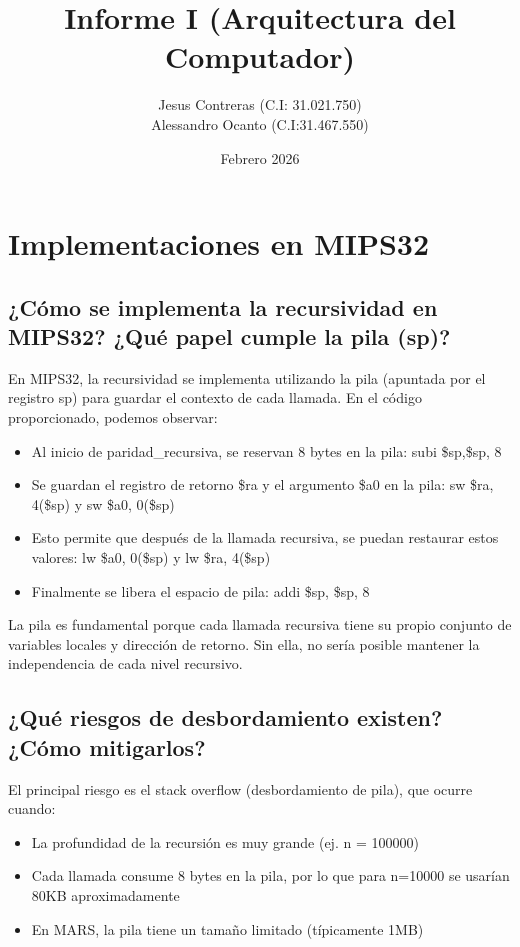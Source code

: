 \documentclass[12pt]{article}
\title{Informe I (Arquitectura del Computador)}
\author{Jesus Contreras (C.I: 31.021.750)\\Alessandro Ocanto (C.I:31.467.550)}
\date{Febrero 2026}
\begin{document}
	
	\maketitle
	
	\section{Implementaciones en MIPS32}
	

	\subsection{¿Cómo se implementa la recursividad en MIPS32? ¿Qué papel cumple la pila (sp)?}
	En MIPS32, la recursividad se implementa utilizando la pila (apuntada por el registro sp) para guardar el contexto de cada llamada. En el código proporcionado, podemos observar:
	
	\begin{itemize}
		\item Al inicio de paridad\_recursiva, se reservan 8 bytes en la pila: subi \$sp,\$sp, 8
		\item Se guardan el registro de retorno \$ra y el argumento \$a0 en la pila: sw \$ra, 4(\$sp) y sw \$a0, 0(\$sp)
		\item Esto permite que después de la llamada recursiva, se puedan restaurar estos valores: lw \$a0, 0(\$sp) y lw \$ra, 4(\$sp)
		\item Finalmente se libera el espacio de pila: addi \$sp, \$sp, 8
	\end{itemize}
	
	La pila es fundamental porque cada llamada recursiva tiene su propio conjunto de variables locales y dirección de retorno. Sin ella, no sería posible mantener la independencia de cada nivel recursivo.
	
	\subsection{¿Qué riesgos de desbordamiento existen? ¿Cómo mitigarlos?}
	El principal riesgo es el stack overflow (desbordamiento de pila), que ocurre cuando:
	\begin{itemize}
		\item La profundidad de la recursión es muy grande (ej. n = 100000)
		\item Cada llamada consume 8 bytes en la pila, por lo que para n=10000 se usarían 80KB aproximadamente
		\item En MARS, la pila tiene un tamaño limitado (típicamente 1MB)
	\end{itemize}
	
\end{document}
